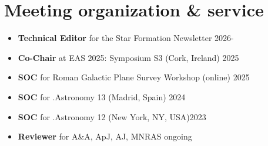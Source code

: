 \section*{Meeting organization \& service}

\begin{itemize}
    \item \textbf{Technical Editor} for the Star Formation Newsletter \hfill 2026-
    \item \textbf{Co-Chair} at EAS 2025: Symposium S3 (Cork, Ireland) \hfill 2025
    \item \textbf{SOC} for Roman Galactic Plane Survey Workshop (online) \hfill 2025
    \item \textbf{SOC} for .Astronomy 13 (Madrid, Spain) \hfill 2024
    \item \textbf{SOC} for .Astronomy 12 (New York, NY, USA)\hfill 2023
    \item \textbf{Reviewer} for A\&A, ApJ, AJ, MNRAS \hfill ongoing
\end{itemize}